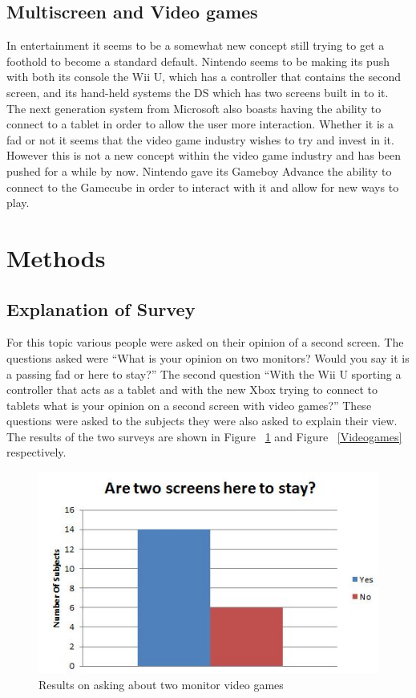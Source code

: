 \documentclass[11pt]{article}
\begin{document}
\subsection{Multiscreen and Video games}
In entertainment it seems to be a somewhat new concept still trying to get a foothold to become a standard default. Nintendo seems to be making its push with both its console the Wii U, which has a controller that contains the second screen, and its hand-held systems the DS which has two  screens built in to it. %
The next generation system from Microsoft also boasts having the ability to connect to a tablet in order to allow the user more interaction. Whether it is a fad or not it seems that the video game industry wishes to try and invest in it. However this is not a new concept within the video game industry and has been pushed for a while by now. Nintendo gave its Gameboy Advance the ability to connect to the Gamecube in order to interact with it and allow for new ways to play.

\section{Methods}
\subsection{Explanation of Survey}
For this topic various people were asked on their opinion of a second screen. The questions asked were “What is your opinion on two monitors? Would you say it is a passing fad or here to stay?” The second question “With the Wii U sporting a controller that acts as a tablet and with the new Xbox trying to connect to tablets what is your opinion on a second screen with video games?” These questions were asked to the subjects they were also asked to explain their view. The results of the two surveys are shown in Figure ~\ref{monitor} and Figure ~\ref{Videogames} respectively.

\begin{figure}[h!]
  \centering
    \includegraphics[width= 1\textwidth]{./Images/Monitors}
  \caption{Results on asking about two monitor video games}
 \label{monitor}
\end{figure}
\end{document}
